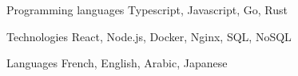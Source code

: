 

\begin{cvskills}

  \cvskill
    {Programming languages} %
    {Typescript, Javascript, Go, Rust} %

  \cvskill
    {Technologies} %
    {React, Node.js, Docker, Nginx, SQL, NoSQL}  %

  \cvskill
    {Languages} %
    {French, English, Arabic, Japanese} %

\end{cvskills}
